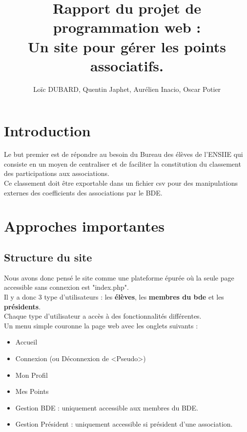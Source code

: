 \documentclass[french]{article}
\author{Loïc DUBARD, Quentin Japhet, Aurélien Inacio, Oscar Potier}
\title{Rapport du projet de programmation web : \\
\textbf{Un site pour gérer les points associatifs}.}
\begin{document}
\maketitle
\tableofcontents
\clearpage
\section*{Introduction}
Le but premier est de répondre au besoin du Bureau des élèves de l'ENSIIE qui consiste en un moyen de centraliser et de faciliter la constitution du classement des participations aux associations.\\

 Ce classement doit être exportable dans un fichier csv pour des manipulations externes des coefficients des associations par le BDE.\\
 
 \clearpage
 
\section{Approches importantes}
\subsection{Structure du site}
Nous avons donc pensé le site comme une plateforme épurée où la seule page accessible sans connexion est "index.php".\\
 Il y a donc 3 type d'utilisateurs : les \textbf{élèves}, les \textbf{membres du bde} et les \textbf{présidents}.\\ Chaque type d'utilisateur a accès à des fonctionnalités différentes.\\ 
 
 Un menu simple couronne la page web avec les onglets suivants : 
 \begin{itemize}
 	\item Accueil
 	\item Connexion (ou Déconnexion de <Pseudo>) 
 	\item Mon Profil
 	\item Mes Points
 	\item Gestion BDE : uniquement accessible aux membres du BDE.
 	\item Gestion Président : uniquement accessible si président d'une association.
 \end{itemize}
 
\end{document}
